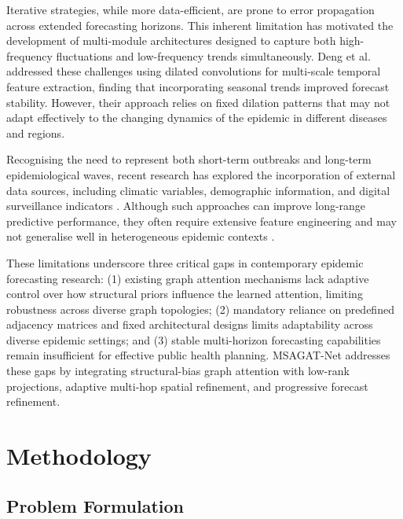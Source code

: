 \documentclass[a4paper,fleqn]{cas-dc}
\begin{document}
Iterative strategies, while more data-efficient, are prone to error propagation across extended forecasting horizons. This inherent limitation has motivated the development of multi-module architectures designed to capture both high-frequency fluctuations and low-frequency trends simultaneously. Deng et al. \cite{dengColaGNNCrosslocationAttention2020a} addressed these challenges using dilated convolutions for multi-scale temporal feature extraction, finding that incorporating seasonal trends improved forecast stability. However, their approach relies on fixed dilation patterns that may not adapt effectively to the changing dynamics of the epidemic in different diseases and regions.

Recognising the need to represent both short-term outbreaks and long-term epidemiological waves, recent research has explored the incorporation of external data sources, including climatic variables, demographic information, and digital surveillance indicators \cite{Luo2023Interpretable, Moss_Zarebski_Dawson_Franklin_Birrell_McCaw_2020}. Although such approaches can improve long-range predictive performance, they often require extensive feature engineering and may not generalise well in heterogeneous epidemic contexts \cite{Panja2022Epicasting}. 

These limitations underscore three critical gaps in contemporary epidemic forecasting research: (1) existing graph attention mechanisms lack adaptive control over how structural priors influence the learned attention, limiting robustness across diverse graph topologies; (2) mandatory reliance on predefined adjacency matrices and fixed architectural designs limits adaptability across diverse epidemic settings; and (3) stable multi-horizon forecasting capabilities remain insufficient for effective public health planning. MSAGAT-Net addresses these gaps by integrating structural-bias graph attention with low-rank projections, adaptive multi-hop spatial refinement, and progressive forecast refinement.

\section{Methodology}
\label{sec:methodology}

\subsection{Problem Formulation}
\end{document}
